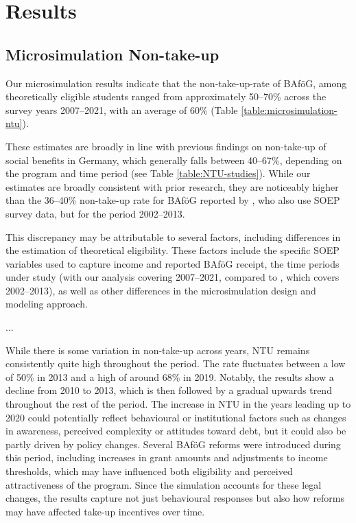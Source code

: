 %
%



\section{Results}
\subsection{Microsimulation Non-take-up}
Our microsimulation results indicate that the non-take-up-rate of BAföG, among theoretically eligible students ranged from approximately 50--70\% across the survey years 2007--2021, with an average of 60\%  (Table \ref{table:microsimulation-ntu}). 

These estimates are broadly in line with previous findings on non-take-up of social benefits in Germany, which generally falls between 40--67\%, depending on the program and time period (see Table \ref{table:NTU-studies}). 
While our estimates are broadly consistent with prior research, they are noticeably higher than the 36--40\% non-take-up rate for BAföG reported by \cite{herber_non-take-up_2019}, who also use SOEP survey data, but for the period 2002--2013.

This discrepancy may be attributable to several factors, including differences in the estimation of theoretical eligibility. These factors include the specific SOEP variables used to capture income and reported BAföG receipt, the time periods under study (with our analysis covering 2007--2021, compared to \cite{herber_non-take-up_2019}, which covers 2002--2013), as well as other differences in the microsimulation design and modeling approach.

...

While there is some variation in non-take-up across years, NTU remains consistently quite high throughout the period. The rate fluctuates between a low of 50\% in 2013 and a high of around 68\% in 2019. Notably, the results show a decline from 2010 to 2013, which is then followed by a gradual upwards trend throughout the rest of the period. The increase in NTU in the years leading up to 2020 could potentially reflect behavioural or institutional factors such as changes in awareness, perceived complexity or attitudes toward debt, but it could also be partly driven by policy changes. Several BAföG reforms were introduced during this period, including increases in grant amounts and adjustments to income thresholds, which may have influenced both eligibility and perceived attractiveness of the program. Since the simulation accounts for these legal changes, the results capture not just behavioural responses but also how reforms may have affected take-up incentives over time.


